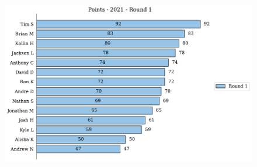 \documentclass[10pt]{article}
\begin{document}
%
\begin{minipage}[t]{13cm}
    \vspace{0pt}
    \begin{figure}[H]
        \vspace{-1cm}
        \includegraphics[width=12cm,height=8cm,keepaspectratio]{../../figures/2021/Points-2021-Round1.pdf}
    \end{figure}
\end{minipage}
\end{document}
